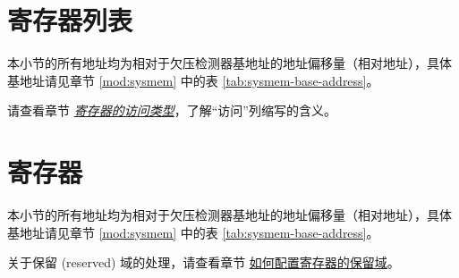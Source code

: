 \documentclass[main\_\_CN.tex]{subfiles}
\begin{document}



\newpage
\hypertarget{brownout-reg-summ}{}
\section{寄存器列表}
\label{sec:brownout-reg-summ}

本小节的所有地址均为相对于欠压检测器基地址的地址偏移量（相对地址），具体基地址请见章节 \ref{mod:sysmem} \textit{} 中的表 \ref{tab:sysmem-base-address}。

请查看章节 \hyperref[glossary-access-types]{\textit{寄存器的访问类型}}，了解“访问”列缩写的含义。





\newpage
\section{寄存器}

本小节的所有地址均为相对于欠压检测器基地址的地址偏移量（相对地址），具体基地址请见章节 \ref{mod:sysmem} \textit{} 中的表 \ref{tab:sysmem-base-address}。

关于保留 (reserved) 域的处理，请查看章节 \hyperref[programming-reserved-field]{如何配置寄存器的保留域}。


\end{document}
